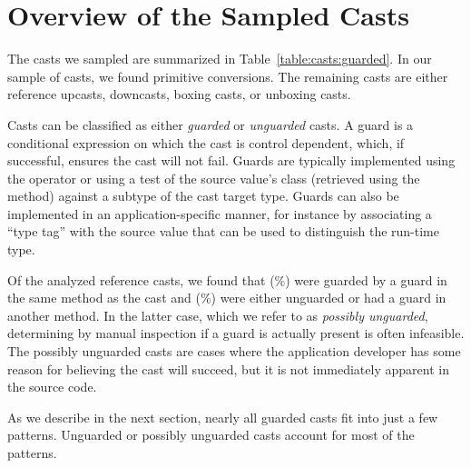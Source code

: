 \section{Overview of the Sampled Casts}
\label{sec:casts:overview}

The casts we sampled are summarized in Table~\ref{table:casts:guarded}.
In our sample of \nSize{} casts,
we found \nPrimitivePattern{} primitive conversions.
The remaining \nReference{} casts are either reference upcasts,
downcasts, boxing casts, or unboxing casts.



Casts can be classified as either \emph{guarded} or \emph{unguarded} casts.
A guard is a conditional expression on which the cast is control dependent,
which, if successful, ensures the cast will not fail.
Guards are typically implemented using the  operator or using
a test of the source value's class (retrieved using the
 method) against a subtype of the cast target type.
Guards can also be implemented in an application-specific manner, for instance
by associating a ``type tag'' with the source value that can be used to
distinguish the run-time type.

Of the \nReference{} analyzed reference casts,
we found that \nGuarded{} (\pGuarded\%) were guarded by a
guard in the same method as the cast and \nUnguarded{} (\pUnguarded\%)
were either unguarded or had a guard in another method.
In the latter case, which we refer to as \emph{possibly unguarded},
determining by manual inspection if a guard is actually
present is often infeasible. The possibly unguarded casts are cases where the application developer
has some reason for believing the cast will succeed, but it is not immediately
apparent in the source code.

As we describe in the next section, nearly all guarded casts fit into just a
few patterns. Unguarded or possibly unguarded casts account for most of the
patterns.